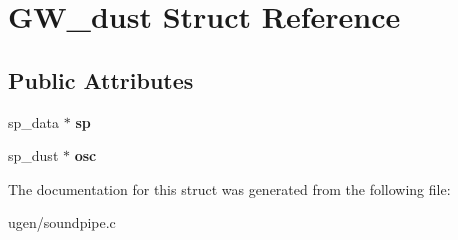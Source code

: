 \hypertarget{structGW__dust}{}\section{G\+W\+\_\+dust Struct Reference}
\label{structGW__dust}
\subsection*{Public Attributes}
\begin{DoxyCompactItemize}
\item 
\hypertarget{structGW__dust_a31036af585213c87cc3f20d985273a72}{}\label{structGW__dust_a31036af585213c87cc3f20d985273a72} 
sp\+\_\+data $\ast$ {\bfseries sp}
\item 
\hypertarget{structGW__dust_a0863f34da8ca8e7bee3d14f4d6eac12f}{}\label{structGW__dust_a0863f34da8ca8e7bee3d14f4d6eac12f} 
sp\+\_\+dust $\ast$ {\bfseries osc}
\end{DoxyCompactItemize}


The documentation for this struct was generated from the following file\+:\begin{DoxyCompactItemize}
\item 
ugen/soundpipe.\+c\end{DoxyCompactItemize}
